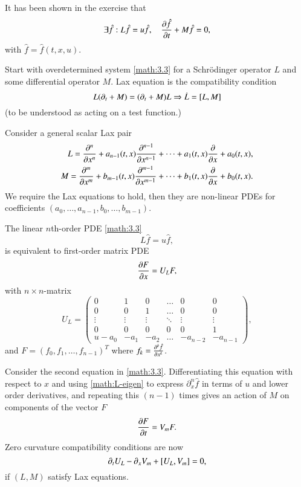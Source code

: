 It has been shown in the exercise that
\begin{equation}
	\exists \hat{f}: L \hat{f} = u \hat{f}, \quad  \pdv{\hat{f}}{t} + M \hat{f} = 0,
	\label{math:3.3}
\end{equation}
with $\hat{f} = \hat{f}(t, x, u)$.

Start with overdetermined system \eqref{math:3.3} for a Schrödinger operator $L$ and some differential operator $M$. Lax equation is the compatibility condition
\begin{equation*}
	L(\partial_t + M) = (\partial_t + M) L \Rightarrow \dot{L} = \comm{L}{M}
\end{equation*}
(to be understood as acting on a test function.)

Consider a general scalar Lax pair
\begin{align*}
	L = \pdv[n]{x} + a_{n-1}(t, x) \pdv[n-1]{x} + \dots + a_1(t, x) \pdv{x} + a_0(t,x), \\
	M = \pdv[m]{x} + b_{m-1}(t, x) \pdv[m-1]{x} + \dots + b_1(t, x) \pdv{x} + b_0(t,x).
\end{align*}
We require the Lax equations to hold, then they are non-linear PDEs for coefficients $(a_0, \dots, a_{n-1},  b_0, \dots,b_{m-1})$. 

The linear $n$th-order PDE \eqref{math:3.3} 
\begin{equation}
	L \hat{f} = u \hat{f},
	\label{math:L-eigen}
\end{equation}
is equivalent to first-order matrix PDE
\begin{equation*}
	\pdv{F}{x}= U_L F,
\end{equation*}
with $n \times n$-matrix
\begin{equation*}
	U_L = \begin{pmatrix} 0 & 1 & 0 & \dots & 0 & 0 \\
								 0 & 0 & 1 & \dots & 0 & 0 \\
							 \vdots & \vdots & \vdots & \ddots & \vdots & \vdots\\ 
							 0 & 0 & 0 & 0 & 0 & 1 \\
							 u-a_0 & -a_1 & -a_2 & \dots & -a_{n-2} & -a_{n-1}
						 \end{pmatrix},
\end{equation*}
and $F = (f_0, f_1, \dots, f_{n-1})^T$ where $f_k = \pdv[k]{\hat{f}}{x}$.

Consider the second equation in \eqref{math:3.3}. Differentiating this equation with respect to $x$ and using \eqref{math:L-eigen} to express $\partial_x^{n} \hat{f}$ in terms of $u$ and lower order derivatives, and repeating this $(n-1)$ times gives an action of $M$ on components of the vector $F$
\begin{equation*}
	\pdv{F}{t} = V_m F.
\end{equation*}
Zero curvature compatibility conditions are now
\begin{equation}
	\partial_t U_L - \partial_x V_m + \comm{U_L}{V_m} = 0,
\end{equation}
if $(L, M)$ satisfy Lax equations.

